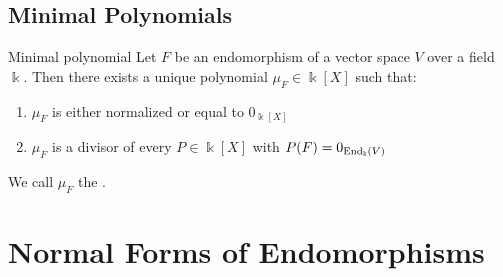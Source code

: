 \section{Minimal Polynomials}
\begin{importanttheorem}{Minimal polynomial}{}
	Let $F$ be an endomorphism of a vector space $V$ over a field $\Bbbk$. Then there exists a unique polynomial $\mu_F \in \Bbbk[X]$ such that:
	\begin{enumerate}
		\item $\mu_F$ is either normalized or equal to $0_{\Bbbk[X]}$
		\item $\mu_F$ is a divisor of every $P \in \Bbbk[X]$ with $P(F) = 0_{\textnormal{End}_{\Bbbk}(V)}$
	\end{enumerate} 
	We call $\mu_F$ the .
\end{importanttheorem}
\chapter{Normal Forms of Endomorphisms}
